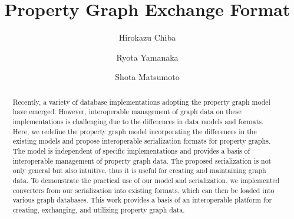 \documentclass[runningheads]{llncs}
\begin{document}
\newtheorem{defi}[theorem]{Definition}
%
\title{Property Graph Exchange Format}
%
%
\author{Hirokazu Chiba \and Ryota Yamanaka \and Shota Matsumoto}
%
%
%
\maketitle              %
%
\begin{abstract}
Recently, a variety of database implementations adopting the property graph model have emerged. However, interoperable management of graph data on these implementations is challenging due to the differences in data models and formats.
Here, we redefine the property graph model incorporating the differences in the existing models and propose interoperable serialization formats for property graphs. The model is independent of specific implementations and provides a basis of interoperable management of property graph data. The proposed serialization is not only general but also intuitive, thus it is useful for creating and maintaining graph data. To demonstrate the practical use of our model and serialization, we implemented converters from our serialization into existing formats, which can then be loaded into various graph databases. 
This work provides a basis of an interoperable platform for creating, exchanging, and utilizing property graph data.
\end{abstract}
\end{document}
